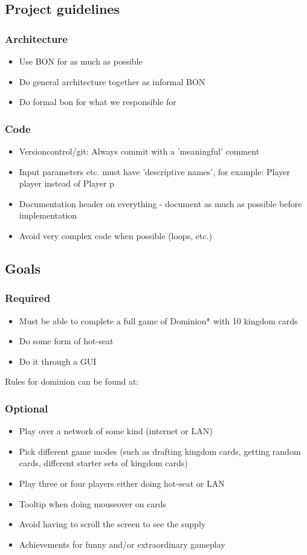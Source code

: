 \subsection{Project guidelines}
\subsubsection{Architecture}
\begin{itemize}
\item Use BON for as much as possible
\item Do general architecture together as informal BON
\item Do formal bon for what we responsible for
\end{itemize}
\subsubsection{Code}
\begin{itemize}
\item Versioncontrol/git: Always commit with a 'meaningful' comment
\item Input parameters etc. must have 'descriptive names', for example: Player player instead of Player p
\item Documentation header on everything - document as much as possible before implementation
\item Avoid very complex code when possible (loops, etc.)
\end{itemize}
\subsection{Goals}
\subsubsection{Required}
\begin{itemize}
\item Must be able to complete a full game of Dominion* with 10 kingdom cards 
\item Do some form of hot-seat
\item Do it through a GUI
\end{itemize}
Rules for dominion can be found at: 
\subsubsection{Optional}
\begin{itemize}
\item Play over a network of some kind (internet or LAN)
\item Pick different game modes (such as drafting kingdom cards, getting random cards, different starter sets of kingdom cards)
\item Play three or four players either doing hot-seat or LAN
\item Tooltip when doing mouseover on cards
\item Avoid having to scroll the screen to see the supply
\item Achievements for funny and/or extraordinary gameplay
\end{itemize}